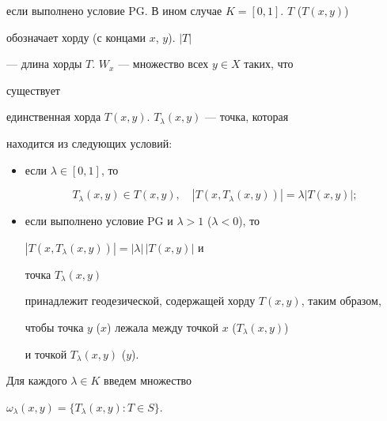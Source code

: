 если выполнено условие PG. В ином случае $K=[0,1]$.\; $T$ ($T(x,y)$) 


обозначает хорду (с концами $x$, $y$).\; $|T|$ 


--- длина хорды $T$.\; $W_x$ --- множество всех $y\in X$ таких, что 


существует 


единственная хорда $T(x,y)$.\; $T_\lambda(x,y)$ --- точка, которая 


находится из следующих условий: 


\begin{itemize} 


\item[a)] если $\lambda\in[0,1]$, то 


$$ 


T_\lambda(x,y)\in T(x,y),\quad 


|T(x,T_\lambda(x,y))|=\lambda|T(x,y)|; 


$$ 


\item[б)] если выполнено условие PG и $\lambda>1$ ($\lambda<0$), то 


$|T(x,T_\lambda(x,y))|=|\lambda|\,|T(x,y)|$ и 


точка $T_\lambda(x,y)$ 


принадлежит геодезической, содержащей хорду $T(x,y)$, таким образом, 


чтобы точка $y$ ($x$) лежала между точкой $x$ ($T_\lambda(x,y)$) 


и точкой $T_\lambda(x,y)$ ($y$). 


\end{itemize} 


 


Для каждого $\lambda\in K$ введем множество 


$\omega_\lambda(x,y)=\{T_\lambda(x,y):T\in S\}$. 


 


